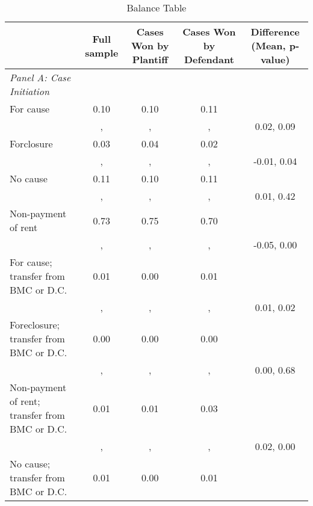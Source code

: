 \begin{table}[htbp]\centering
\def\sym#1{\ifmmode^{#1}\else\(^{#1}\)\fi}
\caption{Balance Table}
\begin{tabular}{l*{4}{c}}
\toprule
                    &\multicolumn{1}{c}{Full sample}&\multicolumn{1}{c}{Cases Won by Plantiff}&\multicolumn{1}{c}{Cases Won by Defendant}&\multicolumn{1}{c}{Difference (Mean, p-value)}\\
\midrule
\emph{Panel A: Case Initiation}&            &            &            &            \\
\hspace{0.25cm}For cause&        0.10&        0.10&        0.11&            \\
                    &          , &          , &          , &  0.02, 0.09\\
\hspace{0.25cm}Forclosure&        0.03&        0.04&        0.02&            \\
                    &          , &          , &          , & -0.01, 0.04\\
\hspace{0.25cm}No cause&        0.11&        0.10&        0.11&            \\
                    &          , &          , &          , &  0.01, 0.42\\
\hspace{0.25cm}Non-payment of rent&        0.73&        0.75&        0.70&            \\
                    &          , &          , &          , & -0.05, 0.00\\
\hspace{0.25cm}For cause; transfer from BMC or D.C.&        0.01&        0.00&        0.01&            \\
                    &          , &          , &          , &  0.01, 0.02\\
\hspace{0.25cm}Foreclosure; transfer from BMC or D.C.&        0.00&        0.00&        0.00&            \\
                    &          , &          , &          , &  0.00, 0.68\\
\hspace{0.25cm}Non-payment of rent; transfer from BMC or D.C.&        0.01&        0.01&        0.03&            \\
                    &          , &          , &          , &  0.02, 0.00\\
\hspace{0.25cm}No cause; transfer from BMC or D.C.&        0.01&        0.00&        0.01&            \\

\end{tabular}
\end{table}

